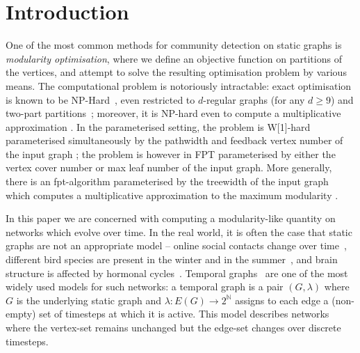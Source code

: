 \documentclass[runningheads]{llncs}
\begin{document}
\section{Introduction}


One of the most common methods for community detection on static graphs is \emph{modularity optimisation}, where we define an objective function on partitions of the vertices, and attempt to solve the resulting optimisation problem by various means. The computational problem is notoriously intractable: exact optimisation is known to be NP-Hard~\cite{nphard}, even restricted to $d$-regular graphs (for any $d\geq 9$) and two-part partitions~\cite{DASGUPTA201350}; moreover, it is NP-hard even to compute a multiplicative approximation \cite{dinh2015network}.  In the parameterised setting, the problem is W[1]-hard parameterised simultaneously by the pathwidth and feedback vertex number of the input graph \cite{w1hard}; the problem is however in FPT parameterised by either the vertex cover number \cite{w1hard} or max leaf number \cite{garvardtMaxLeaf24} of the input graph.  More generally, there is an fpt-algorithm parameterised by the treewidth of the input graph which computes a multiplicative approximation to the maximum modularity \cite{w1hard}.



In this paper we are concerned with computing a modularity-like quantity on networks which evolve over time.  In the real world, it is often the case that static graphs are not an appropriate model -- online social contacts change over time~\cite{Evkoski_Pelicon_Mozetic_Ljubesic_Kralj-Novak_2022}, different bird species are present in the winter and in the summer~\cite{pilosof2017multilayer}, and brain structure is affected by hormonal cycles~\cite{Mueller_Pritschet_Santander_Taylor_Grafton_Jacobs_Carlson_2021}. Temporal graphs~\cite{kempeTemporal02} are one of the most widely used models for such networks: a temporal graph is a pair $(G,\lambda)$ where $G$ is the underlying static graph and $\lambda:E(G) \rightarrow 2^{\mathbb{N}}$ assigns to each edge a (non-empty) set of timesteps at which it is active.  This model describes networks where the vertex-set remains unchanged but the edge-set changes over discrete timesteps.
\end{document}
